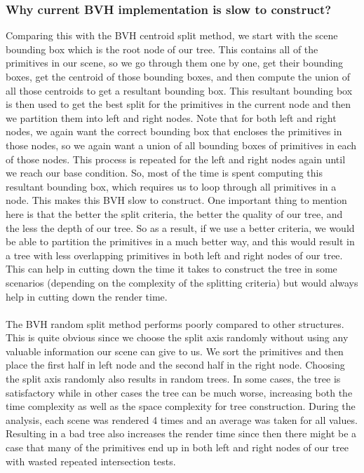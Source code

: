 \documentclass[11pt,a4paper]{article}
\begin{document}
\subsubsection{Why current BVH implementation is slow to construct?}
Comparing this with the BVH centroid split method, we start with the scene bounding box which is the root node of our tree. This contains all of the primitives in our scene, so we go through them one by one, get their bounding boxes, get the centroid of those bounding boxes, and then compute the union of all those centroids to get a resultant bounding box. This resultant bounding box is then used to get the best split for the primitives in the current node and then we partition them into left and right nodes. Note that for both left and right nodes, we again want the correct bounding box that encloses the primitives in those nodes, so we again want a union of all bounding boxes of primitives in each of those nodes. This process is repeated for the left and right nodes again until we reach our base condition. So, most of the time is spent computing this resultant bounding box, which requires us to loop through all primitives in a node. This makes this BVH slow to construct. One important thing to mention here is that the better the split criteria, the better the quality of our tree, and the less the depth of our tree. So as a result, if we use a better criteria, we would be able to partition the primitives in a much better way, and this would result in a tree with less overlapping primitives in both left and right nodes of our tree. This can help in cutting down the time it takes to construct the tree in some scenarios (depending on the complexity of the splitting criteria) but would always help in cutting down the render time.
\\~\\
The BVH random split method performs poorly compared to other structures. This is quite obvious since we choose the split axis randomly without using any valuable information our scene can give to us. We sort the primitives and then place the first half in left node and the second half in the right node. Choosing the split axis randomly also results in random trees. In some cases, the tree is satisfactory while in other cases the tree can be much worse, increasing both the time complexity as well as the space complexity for tree construction. During the analysis, each scene was rendered 4 times and an average was taken for all values. Resulting in a bad tree also increases the render time since then there might be a case that many of the primitives end up in both left and right nodes of our tree with wasted repeated intersection tests.
\end{document}
